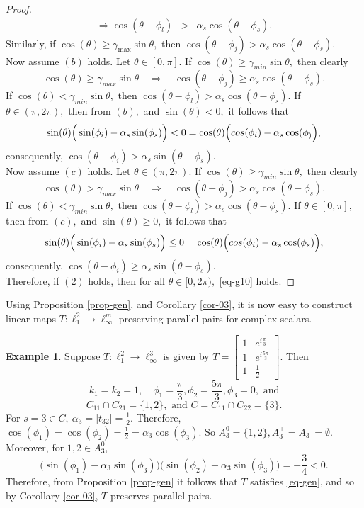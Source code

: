 \documentclass{amsart}
\theoremstyle{definition}
\newtheorem{example}[theorem]{Example}
\theoremstyle{remark}
\numberwithin{equation}{section}
\begin{document}
\begin{proof}
\begin{eqnarray*}
			\Rightarrow \cos(\theta-\phi_l)&>&\alpha_s\cos(\theta-\phi_s).
		\end{eqnarray*}
		Similarly, if $\cos(\theta)\geq \gamma_{\max}\sin\theta,$ then $ \cos(\theta-\phi_j)>\alpha_s\cos(\theta-\phi_s).$ \\%
		Now assume $(b)$ holds. Let $\theta\in[0,\pi].$ %
		If $\cos(\theta)\geq \gamma_{min}\sin\theta,$ then clearly $$\cos(\theta)\geq \gamma_{max}\sin\theta \quad \Rightarrow \quad\cos(\theta-\phi_j)\geq \alpha_s\cos(\theta-\phi_s).$$ If $\cos(\theta)< \gamma_{min}\sin\theta,$ then $\cos(\theta-\phi_l)> \alpha_s\cos(\theta-\phi_s).$ If $\theta\in (\pi,2\pi),$ then from $(b),$ and $\sin(\theta)<0,$ it follows that $$\sin(\theta)\Big(\sin(\phi_i)-\alpha_s\sin(\phi_s)\Big)<0=\cos(\theta)\Big(\\cos(\phi_i)-\alpha_s\cos(\phi_)\Big),$$
		consequently, $\cos(\theta-\phi_i)>\alpha_s\sin(\theta-\phi_s).$\\
		Now assume $(c)$ holds. Let $\theta\in(\pi,2\pi).$ %
		If $\cos(\theta)\geq \gamma_{min}\sin\theta,$ then clearly 
		$$\cos(\theta)> \gamma_{max}\sin\theta \quad \Rightarrow \quad   \cos(\theta-\phi_j)> \alpha_s\cos(\theta-\phi_s).$$
		If $\cos(\theta)< \gamma_{min}\sin\theta,$ then $\cos(\theta-\phi_l)> \alpha_s\cos(\theta-\phi_s).$ If $\theta\in [0,\pi],$ then from $(c),$ and $\sin(\theta)\geq 0,$ it follows that $$\sin(\theta)\Big(\sin(\phi_i)-\alpha_s\sin(\phi_s)\Big)\leq0=\cos(\theta)\Big(\\cos(\phi_i)-\alpha_s\cos(\phi_s)\Big),$$
		consequently, $\cos(\theta-\phi_i)\geq\alpha_s\sin(\theta-\phi_s).$\\
		Therefore, if $(2)$ holds, then for all $\theta\in [0,2\pi),$ \eqref{eq-g10} holds.
	\end{proof}
	
	Using  Proposition \ref{prop-gen}, and Corollary \ref{cor-03}, it is now easy to construct linear maps $T:\ell_1^2\to \ell_\infty^m$ preserving parallel pairs for complex scalars.
	\begin{example}
		Suppose $T:\ell_1^2\to \ell_\infty^3$ is given by $T=\begin{bmatrix}
			1&e^{i\frac{\pi}{3}}\\
			1&e^{i\frac{5\pi}{3}}\\
			1&\frac{1}{2}
		\end{bmatrix}.$ Then $$k_1=k_2=1,\quad \phi_1=\frac{\pi}{3},\phi_2=\frac{5\pi}{3},\phi_3=0, \text{ and}$$
	$$C_{11}\cap C_{21}=\{1,2\}, \text{ and }C=C_{11}\cap C_{22}=\{3\}.$$ For $s=3\in C,~ \alpha_3=|t_{32}|=\frac{1}{2}.$	Therefore, 
		$\cos(\phi_1)=\cos(\phi_2)=\frac{1}{2}=\alpha_3\cos(\phi_3).$ So $A_3^0=\{1,2\}, A_3^+=A_3^-=\emptyset.$ Moreover, for $1,2\in A_3^0,$ $$\Big(\sin(\phi_1)-\alpha_3\sin(\phi_3)\Big)\Big(\sin(\phi_2)-\alpha_3\sin(\phi_3)\Big)=-\frac{3}{4}<0.$$
		Therefore, from Proposition \ref{prop-gen} it follows that  $T$ satisfies \eqref{eq-gen}, and so by Corollary \ref{cor-03}, $T$ preserves parallel pairs. 
	\end{example}
\end{document}
